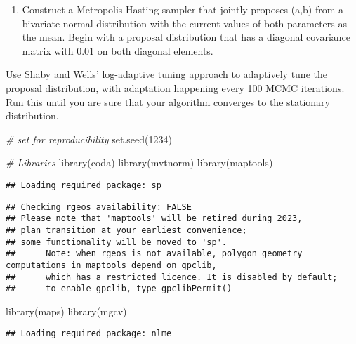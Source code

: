 \documentclass[
]{article}
\newenvironment{Shaded}{\begin{snugshade}}{\end{snugshade}}
\newcommand{\CommentTok}[1]{\textcolor[rgb]{0.56,0.35,0.01}{\textit{#1}}}
\newcommand{\DecValTok}[1]{\textcolor[rgb]{0.00,0.00,0.81}{#1}}
\newcommand{\FunctionTok}[1]{\textcolor[rgb]{0.00,0.00,0.00}{#1}}
\newcommand{\NormalTok}[1]{#1}
\providecommand{\tightlist}{%
  \setlength{\itemsep}{0pt}\setlength{\parskip}{0pt}}
\begin{document}
\begin{enumerate}
\def\labelenumi{\alph{enumi}.}
\tightlist
\item
  Construct a Metropolis Hasting sampler that jointly proposes (a,b)
  from a bivariate normal distribution with the current values of both
  parameters as the mean. Begin with a proposal distribution that has a
  diagonal covariance matrix with 0.01 on both diagonal elements.
\end{enumerate}

Use Shaby and Wells' log-adaptive tuning approach to adaptively tune the
proposal distribution, with adaptation happening every 100 MCMC
iterations. Run this until you are sure that your algorithm converges to
the stationary distribution.

\begin{Shaded}
\begin{Highlighting}[]
\CommentTok{\# set for reproducibility}
\FunctionTok{set.seed}\NormalTok{(}\DecValTok{1234}\NormalTok{)}

\CommentTok{\# Libraries}
\FunctionTok{library}\NormalTok{(coda)}
\FunctionTok{library}\NormalTok{(mvtnorm)}
\FunctionTok{library}\NormalTok{(maptools)}
\end{Highlighting}
\end{Shaded}

\begin{verbatim}
## Loading required package: sp
\end{verbatim}

\begin{verbatim}
## Checking rgeos availability: FALSE
## Please note that 'maptools' will be retired during 2023,
## plan transition at your earliest convenience;
## some functionality will be moved to 'sp'.
##      Note: when rgeos is not available, polygon geometry     computations in maptools depend on gpclib,
##      which has a restricted licence. It is disabled by default;
##      to enable gpclib, type gpclibPermit()
\end{verbatim}

\begin{Shaded}
\begin{Highlighting}[]
\FunctionTok{library}\NormalTok{(maps)}
\FunctionTok{library}\NormalTok{(mgcv)}
\end{Highlighting}
\end{Shaded}

\begin{verbatim}
## Loading required package: nlme
\end{verbatim}
\end{document}
